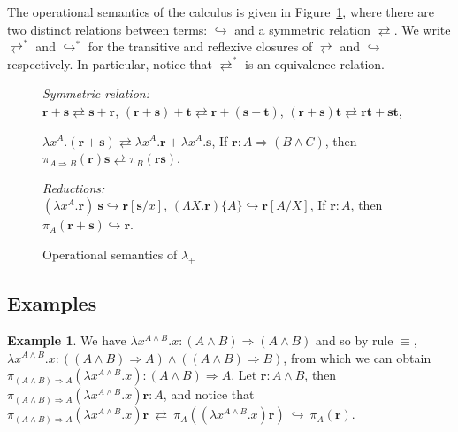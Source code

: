 \documentclass[final,copyright,creativecommons]{eptcs}
\newcommand{\OurCalculus}{\ensuremath{\lambda_+}}
\newcommand{\eq}{\ensuremath{\rightleftarrows}}
\newcommand{\re}{\ensuremath{\hookrightarrow}}
\newcommand{\ve}[1]{\ensuremath{\mathrm{\textbf{#1}}}}
\theoremstyle{definition}
\newtheorem{example}[theorem]{Example}
\begin{document}
The operational semantics of the calculus is given in Figure~\ref{fig:opSem}, where there are two distinct relations between terms: $\re$ and a symmetric relation $\eq$.
We write $\eq^*$ and $\re^*$ for the transitive and reflexive closures of $\eq$ and $\re$ respectively.
In particular, notice that $\eq^*$ is an equivalence relation.

\begin{figure}[!h]\centering
    \emph{Symmetric relation:}\\
    \hspace{1cm}$\ve r+\ve s\eq\ve s+\ve r$,\hfill
	$(\ve r+\ve s)+\ve t\eq\ve r+(\ve s+\ve t)$,\hfill
    $(\ve r+\ve s)\ve t\eq\ve r\ve t+\ve s\ve t$,\hspace{1cm}

	\hspace{1cm}$\lambda x^A.(\ve r+\ve s)\eq\lambda x^A.\ve r+\lambda x^A.\ve s$,\hfill
	If $\ve r:A\Rightarrow (B\wedge C)$, then $\pi_{A\Rightarrow B}(\ve r)\ve s\eq\pi_B(\ve r\ve s)$.\hspace{1cm}
\vspace{0.3cm}

	\emph{Reductions:}\\
    \hspace{1cm}$(\lambda x^A.\ve r)~\ve s\re\ve r[\ve s/x]$,\hfill
	$(\Lambda X.\ve r)\{A\}\re\ve r[A/X]$,\hfill
    If $\ve r:A$, then $\pi_A(\ve r+\ve s)\re\ve r$.\hspace{1cm}

	\caption{Operational semantics of \OurCalculus}
	\label{fig:opSem}
\end{figure}

\subsection{Examples}
\begin{example} We have
 $\lambda x^{A\wedge B}.x:(A\wedge B)\Rightarrow (A\wedge B)$ and so by rule $\equiv$,
 $\lambda x^{A\wedge B}.x:((A\wedge B)\Rightarrow A)\wedge((A\wedge B)\Rightarrow B)$, from which we can obtain $\pi_{(A\wedge B)\Rightarrow A}(\lambda x^{A\wedge B}.x):(A\wedge B)\Rightarrow A$.
 Let $\ve r:A\wedge B$, then $\pi_{(A\wedge B)\Rightarrow A}(\lambda x^{A\wedge B}.x)\ve r:A$,
and notice that
 $\pi_{(A\wedge B)\Rightarrow A}(\lambda x^{A\wedge B}.x)\ve r~\eq~\pi_A((\lambda x^{A\wedge B}.x)\ve r)~\re~\pi_A(\ve r)$.
\end{example}
\end{document}
